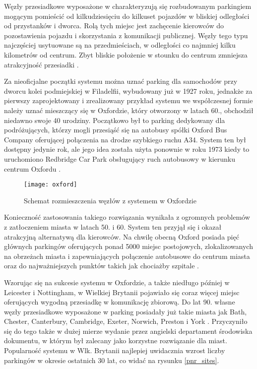 \documentclass[twoside,12pt]{article}
\begin{document}
	Węzły przesiadkowe wyposażone w \pnr{} charakteryzują się rozbudowanym parkingiem mogącym pomieścić od kilkudziesięciu do kilkuset pojazdów w bliskiej odległości od przystanków i dworca. Rolą tych miejsc jest zachęcenie kierowców do pozostawienia pojazdu i skorzystania z komunikacji publicznej. Węzły tego typu najczęściej usytuowane są na przedmieściach, w odległości co najmniej kilku kilometrów od centrum. Zbyt bliskie położenie w stounku do centrum zmniejsza atrakcyjność przesiadki \cite{szarata}.
	
	Za nieoficjalne początki systemu \pnr{} można uznać parking dla samochodów przy dworcu kolei podmiejskiej w Filadelfii, wybudowany już w 1927 roku, jednakże za pierwszy zaprojektowany i zrealizowany przykład systemu \pnr{} we współczesnej formie należy uznać mieszczący się w Oxfordzie, który otworzony w latach 60., obchodził niedawno swoje 40 urodziny. Początkowo był to parking dedykowany dla podróżujących, którzy mogli przesiąść się na autobusy spółki Oxford Bus Company oferującej połączenia na drodze szybkiego ruchu A34. System ten był dostępny jedynie rok, ale jego idea została użyta ponownie w roku 1973 kiedy to uruchomiono Redbridge Car Park obsługujący ruch autobusowy w kierunku centrum Oxfordu \cite{oxford}.
	
	\begin{figure}[H]
		\centering
		\texttt{[image: oxford]}\\
		\caption{Schemat rozmieszczenia węzłów z systemem \pnr{} w Oxfordzie}
	\end{figure}
	
		Konieczność zastosowania takiego rozwiązania wynikała z ogromnych problemów z zatłoczeniem miasta w latach 50. i 60. System ten przyjął się i okazał atrakcyjną alternatywą dla kierowców. Na chwilę obecną Oxford posiada pięć głównych parkingów \pnr{} oferujących ponad 5000 miejsc postojowych, zlokalizowanych na obrzeżach miasta i zapewniających połączenie autobusowe do centrum miasta oraz do najważniejszych punktów takich jak chociażby szpitale \cite{oxford2}.
		
	Wzorując się na sukcesie systemu w Oxfordzie, a także niedługo później w Leicester i Nottingham, w Wielkiej Brytanii pojawiało się coraz więcej miejsc oferujących wygodną przesiadkę w komunikację zbiorową. Do lat 90. własne węzły przesiadkowe wyposażone w parking posiadały już takie miasta jak Bath, Chester, Canterbury, Cambridge, Exeter, Norwich, Preston i York \cite{rps}. Przyczyniło się do tego także w dużej mierze wydanie przez angielski departament środowiska dokumentu, w którym \pnr{} był zalecany jako korzystne rozwiązanie dla miast. Popularność systemu w Wlk. Brytanii najlepiej uwidacznia wzrost liczby parkingów w okresie ostatnich 30 lat, co widać na rysunku \ref{pnr_sites}.
	
\end{document}
